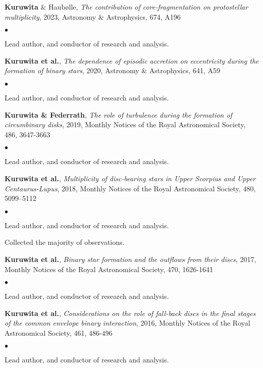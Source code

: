 \documentclass[margin,line]{res}
\newenvironment{list1}{
	\begin{list}{\ding{113}}{%
			\setlength{\itemsep}{0in}
			\setlength{\parsep}{0in} \setlength{\parskip}{0in}
			\setlength{\topsep}{0in} \setlength{\partopsep}{0in} 
			\setlength{\leftmargin}{0.17in}}}{\end{list}}
\newenvironment{list2}{
	\begin{list}{$\bullet$}{%
			\setlength{\itemsep}{0in}
			\setlength{\parsep}{0in} \setlength{\parskip}{0in}
			\setlength{\topsep}{0in} \setlength{\partopsep}{0in} 
			\setlength{\leftmargin}{0.2in}}}{\end{list}}
\begin{document}
\begin{resume}
\begin{list1}
        \item[]{\bf Kuruwita} \& Haub{\o}lle, \emph{The contribution of core-fragmentation on protostellar multiplicity}, 2023, Astronomy \& Astrophysics, 674, A196
	\begin{list2}
		\item Lead author, and conductor of research and analysis.\\
	\end{list2}
	\item[]{\bf Kuruwita et al.}, \emph{The dependence of episodic accretion on eccentricity during the formation of binary stars}, 2020, Astronomy \& Astrophysics, 641, A59
	\begin{list2}
		\item Lead author, and conductor of research and analysis.\\
	\end{list2}
	\item[] {\bf Kuruwita \& Federrath}, \emph{The role of turbulence during the formation of circumbinary disks}, 2019, Monthly Notices of the Royal Astronomical Society, 486, 3647-3663
	\begin{list2}
		\item Lead author, and conductor of research and analysis.\\
	\end{list2}
	\item[] {\bf Kuruwita et al.}, \emph{Multiplicity of disc-bearing stars in Upper Scorpius and Upper Centaurus-Lupus}, 2018, Monthly Notices of the Royal Astronomical Society, 480, 5099–5112
	\begin{list2}
		\item Lead author, and conductor of research and analysis.
		\item Collected the majority of observations.\\
	\end{list2}
	\item[] {\bf Kuruwita et al.}, \emph{Binary star formation and the outflows from their discs}, 2017, Monthly Notices of the Royal Astronomical Society, 470, 1626-1641
	\begin{list2}
		\item Lead author, and conductor of research and analysis.\\
	\end{list2}
	\item[] {\bf Kuruwita et al.}, \emph{Considerations on the role of fall-back discs in the final stages of the common envelope binary interaction}, 2016, Monthly Notices of the Royal Astronomical Society, 461, 486-496
	\begin{list2}
		\item Lead author, and conductor of research and analysis.\\
	\end{list2}


\end{list1}
\end{resume}
\end{document}
